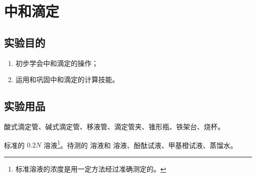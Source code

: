 \section{中和滴定}
\subsection*{实验目的}
\begin{enumerate}[1.]
  \item 初步学会中和滴定的操作；
  \item 运用和巩固中和滴定的计算技能。
\end{enumerate}
\subsection*{实验用品}
酸式滴定管、碱式滴定管、移液管、滴定管夹、锥形瓶、铁架台、烧杯。

标准的 $0.2N$  溶液\footnote{标准溶液的浓度是用一定方法经过准确测定的。}。待测的  溶液和  溶液、酚酞试液、甲基橙试液、蒸馏水。


